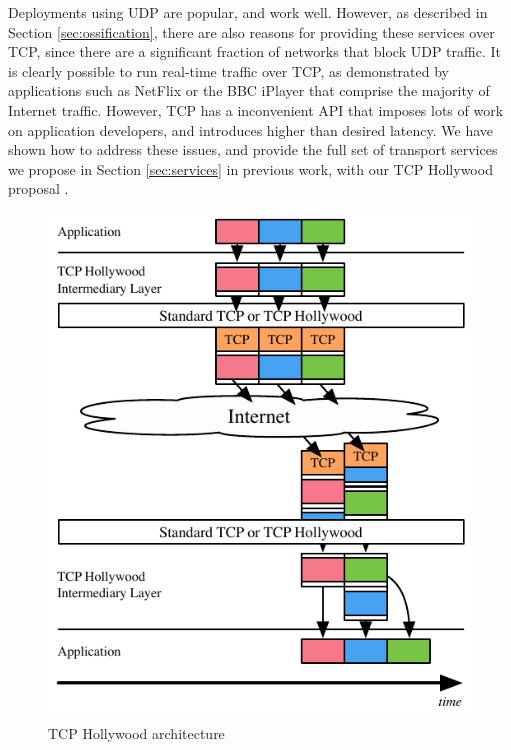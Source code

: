 \documentclass{sig-alternate-05-2015}
\begin{document}
Deployments using UDP are popular, and work well. However, as described in
Section \ref{sec:ossification}, there are also reasons for providing these 
services over TCP, since there are a significant fraction of networks that
block UDP traffic. It is clearly possible to run real-time traffic over
TCP, as demonstrated by applications such as NetFlix or the BBC iPlayer
that comprise the majority of Internet traffic. However, TCP has a
inconvenient API that imposes lots of work on application developers, and
introduces higher than desired latency. We have shown how to address these
issues, and provide the full set of transport services we propose in
Section \ref{sec:services} in previous work, with our TCP Hollywood
proposal \cite{mcquistin2016hollywood}.

\begin{figure}[t]
 \centering
 \includegraphics[scale=0.965]{figures/tcp-hollywood.pdf}
 \caption{TCP Hollywood architecture}
\label{diagram:tcp-hollywood}
\end{figure}
\end{document}
